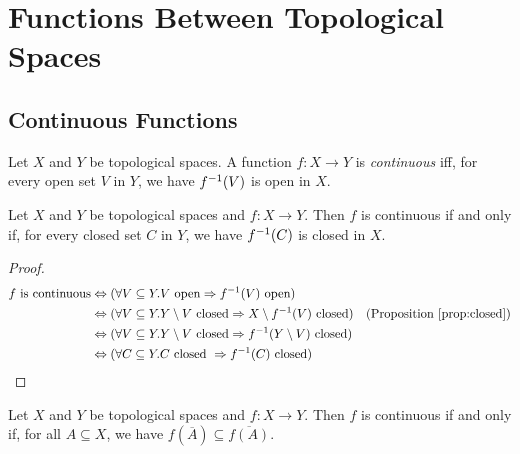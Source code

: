 \chapter{Functions Between Topological Spaces}

\section{Continuous Functions}

\begin{df}[Continuous]
  Let $X$ and $Y$ be topological spaces. A function $f : X \rightarrow Y$ is \emph{continuous} iff, for every open set $V$ in $Y$, we have ${f}^{-1}(V)$ is open in $X$.
\end{df}

\begin{prop}
  \label{prop:continuous:closed}
  Let $X$ and $Y$ be topological spaces and $f : X \rightarrow Y$. Then $f$ is continuous if and only if, for every closed set $C$ in $Y$, we have ${f}^{-1}(C)$ is closed in $X$.
\end{prop}

\begin{proof}
  \pf
  \begin{align*}
    f \text{ is continuous} & \Leftrightarrow (\forall V \subseteq Y. V \text{ open} \Rightarrow {f}^{-1}(V) \text{ open}) \\
    & \Leftrightarrow (\forall V \subseteq Y. Y \setminus V \text{ closed} \Rightarrow X \setminus {f}^{-1}(V) \text{ closed}) & (\text{Proposition \ref{prop:closed}})\\
    & \Leftrightarrow (\forall V \subseteq Y. Y \setminus V \text{ closed} \Rightarrow {f}^{-1}(Y \setminus V) \text{ closed}) \\
    & \Leftrightarrow (\forall C \subseteq Y. C \text{ closed } \Rightarrow {f}^{-1}(C) \text{ closed}) & \relax
  \end{align*}
\end{proof}

\begin{prop}
  \label{prop:continuous:closure}
  Let $X$ and $Y$ be topological spaces and $f : X \rightarrow Y$. Then $f$ is continuous if and only if, for all $A \subseteq X$, we have $f(\overline{A}) \subseteq \overline{f(A)}$.
\end{prop}

